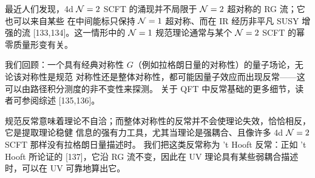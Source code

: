 最近人们发现，4d $\mathcal{N}=2$ SCFT 的涌现并不局限于 $\mathcal{N}=2$ 超对称的 RG 流；它也可以来自某些
在中间能标只保持 $\mathcal{N}=1$ 超对称、而在 IR 经历非平凡 SUSY 增强的流 [133,134]。这一情形中的
$\mathcal{N}=1$ 规范理论通常与某个 $\mathcal{N}=2$ SCFT 的幂零质量形变有关。


我们回顾：一个具有经典对称性 $G$（例如拉格朗日量的对称性）的量子场论，无论该对称性是规范
对称性还是整体对称性，都可能因量子效应而出现反常——这可以由路径积分测度的非不变性来探测。
关于 QFT 中反常基础的更多细节，读者可参阅综述 [135,136]。

规范反常意味着理论不自洽；而整体对称性的反常并不会使理论失效，恰恰相反，它是提取理论稳健
信息的强有力工具，尤其当理论是强耦合、且像许多 4d $\mathcal{N}=2$ SCFT 那样没有拉格朗日量描述时。
我们把这类反常称为 't Hooft 反常：正如 't Hooft 所论证的 [137]，它沿 RG 流不变，因此在 UV
理论具有某些弱耦合描述时，可以在 UV 可靠地算出它。

